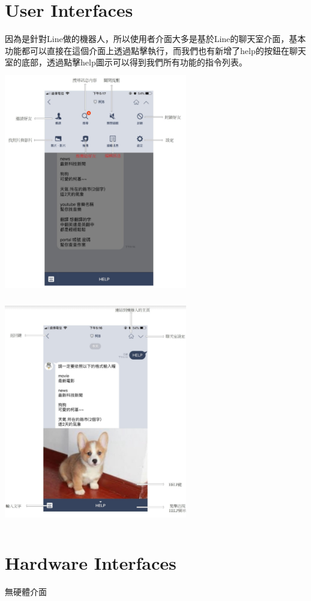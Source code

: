 \documentclass{scrreprt}
\begin{document}
\begin{CJK}{UTF8}{bkai}
\section{User Interfaces}
因為是針對Line做的機器人，所以使用者介面大多是基於Line的聊天室介面，基本功能都可以直接在這個介面上透過點擊執行，而我們也有新增了help的按鈕在聊天室的底部，透過點擊help圖示可以得到我們所有功能的指令列表。\\
\includegraphics[width=8cm,height=10cm]{help1.png}\includegraphics[width=8cm,height=10cm]{help2.png} 

\section{Hardware Interfaces}
無硬體介面


\end{CJK}
\end{document}

